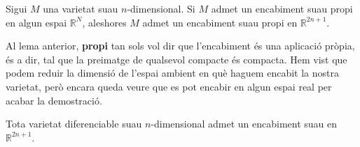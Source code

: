 \begin{lema}\label{lema:encabiment_whitney}
    Sigui $M$ una varietat suau $n$-dimensional. Si $M$ admet un encabiment suau propi en algun espai $\mathbb R^N$, aleshores $M$ admet un encabiment suau propi en $\mathbb R^{2n+1}$.
\end{lema}

Al lema anterior, \textbf{propi} tan sols vol dir que l'encabiment és una aplicació pròpia, és a dir, tal que la preimatge de qualsevol compacte és compacta. Hem vist que podem reduir la dimensió de l'espai ambient en què haguem encabit la nostra varietat, però encara queda veure que es pot encabir en algun espai real per acabar la demostració.

\begin{teo}
    Tota varietat diferenciable suau $n$-dimensional admet un encabiment suau en $\mathbb R^{2n+1}$.
\end{teo}
